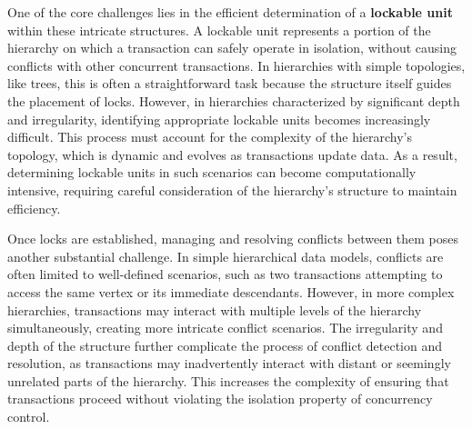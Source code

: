 One of the core challenges lies in the efficient determination of a \textbf{lockable unit} within these intricate structures. A lockable unit represents a portion of the hierarchy on which a transaction can safely operate in isolation, without causing conflicts with other concurrent transactions. In hierarchies with simple topologies, like trees, this is often a straightforward task because the structure itself guides the placement of locks. However, in hierarchies characterized by significant depth and irregularity, identifying appropriate lockable units becomes increasingly difficult. This process must account for the complexity of the hierarchy’s topology, which is dynamic and evolves as transactions update data. As a result, determining lockable units in such scenarios can become computationally intensive, requiring careful consideration of the hierarchy’s structure to maintain efficiency.

Once locks are established, managing and resolving conflicts between them poses another substantial challenge. In simple hierarchical data models, conflicts are often limited to well-defined scenarios, such as two transactions attempting to access the same vertex or its immediate descendants. However, in more complex hierarchies, transactions may interact with multiple levels of the hierarchy simultaneously, creating more intricate conflict scenarios. The irregularity and depth of the structure further complicate the process of conflict detection and resolution, as transactions may inadvertently interact with distant or seemingly unrelated parts of the hierarchy. This increases the complexity of ensuring that transactions proceed without violating the isolation property of concurrency control.


